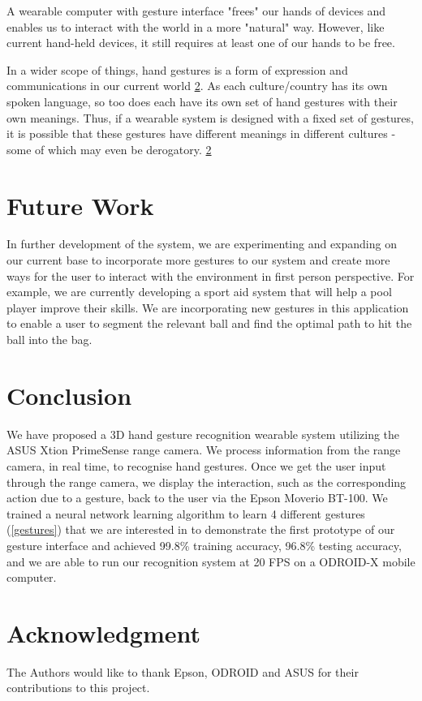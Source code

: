\documentclass[conference]{IEEEtran}
\begin{document}
A wearable computer with gesture interface "frees" our hands of devices and enables us to interact with the world in a more "natural" way. However, like current hand-held devices, it still requires at least one of our hands to be free.

In a wider scope of things, hand gestures is a form of expression and communications in our current world \ref{}. As each culture/country has its own spoken language, so too does each have its own set of hand gestures with their own meanings. Thus, if a wearable system is designed with a fixed set of gestures, it is possible that these gestures have different meanings in different cultures - some of which may even be derogatory. \ref{}

\section{Future Work}
In further development of the system, we are experimenting and expanding on our current base to incorporate more gestures to our system and create more ways for the user to interact with the environment in first person perspective. For example, we are currently developing a sport aid system that will help a pool player improve their skills. We are incorporating new gestures in this application to enable a user to segment the relevant ball and find the optimal path to hit the ball into the bag.

\section{Conclusion}
We have proposed a 3D hand gesture recognition wearable system utilizing the ASUS Xtion PrimeSense range camera. We process information from the range camera, in real time, to recognise hand gestures. Once we get the user input through the range camera, we display the interaction, such as the corresponding action due to a gesture, back to the user via the Epson Moverio BT-100. We trained a neural network learning algorithm to learn 4 different gestures (\ref{gestures}) that we are interested in to demonstrate the first prototype of our gesture interface and achieved 99.8\% training accuracy, 96.8\% testing accuracy, and we are able to run our recognition system at 20 FPS on a ODROID-X mobile computer.


\section*{Acknowledgment}
The Authors would like to thank Epson, ODROID and ASUS for their contributions to this project.
\end{document}
